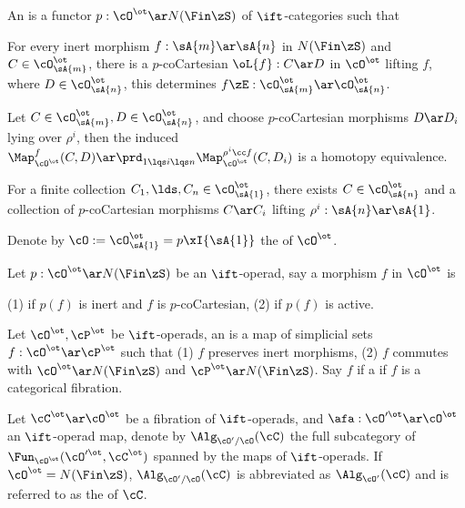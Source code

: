 \documentclass[article, a4paper, twoside]{universal}
\begin{document}
\begin{dfn}[2.1.1.10, 2.1.1.12]
    An  is a functor $p:\cO^{\ot}\ar N(\Fin\zS)$ of $\ift$-categories such that
    \begin{enr}[label=(\arabic*)]
        \item For every inert morphism $f:\sA{m}\ar\sA{n}$ in $N(\Fin\zS)$ and $C\in\cO^{\ot}_{\sA{m}}$, there is a $p$-coCartesian $\oL{f}:C\ar D$ in $\cO^{\ot}$ lifting $f$, where $D\in\cO^{\ot}_{\sA{n}}$, this determines $f\zE:\cO_{\sA{m}}^{\ot}\ar\cO_{\sA{n}}^{\ot}$.
        \item Let $C\in\cO_{\sA{m}}^{\ot},D\in\cO_{\sA{n}}^{\ot}$, and choose $p$-coCartesian morphisms $D\ar D_{i}$ lying over $\rho^{i}$, then the induced $\Map_{\cO^{\ot}}^{f}(C,D)\ar\prd_{1\lqs i\lqs n}\Map_{\cO^{\ot}}^{\rho^{i}\cc f}(C,D_{i})$ is a homotopy equivalence.
        \item For a finite collection $C_{1},\lds,C_{n}\in\cO_{\sA{1}}^{\ot}$, there exists $C\in\cO_{\sA{n}}^{\ot}$ and a collection of $p$-coCartesian morphisms $C\ar C_{i}$ lifting $\rho^{i}:\sA{n}\ar\sA{1}$.
    \end{enr}

    Denote by $\cO:=\cO^{\ot}_{\sA{1}}=p\xI\{\sA{1}\}$ the  of $\cO^{\ot}$.
\end{dfn}

\begin{dfn}[2.1.2.3]
    Let $p:\cO^{\ot}\ar N(\Fin\zS)$ be an $\ift$-operad, say a morphism $f$ in $\cO^{\ot}$ is

    (1)  if $p(f)$ is inert and $f$ is $p$-coCartesian, (2)  if $p(f)$ is active.
\end{dfn}

\begin{dfn}[2.1.2.7, 2.1.2.10]
    Let $\cO^{\ot},\cP^{\ot}$ be $\ift$-operads, an  is a map of simplicial sets $f:\cO^{\ot}\ar\cP^{\ot}$ such that (1) $f$ preserves inert morphisms, (2) $f$ commutes with $\cO^{\ot}\ar N(\Fin\zS)$ and $\cP^{\ot}\ar N(\Fin\zS)$. Say $f$ if a  if $f$ is a categorical fibration.
\end{dfn}

\begin{dfn}[2.1.3.1]
    Let $\cC^{\ot}\ar\cO^{\ot}$ be a fibration of $\ift$-operads, and $\afa:\cO'^{\ot}\ar\cO^{\ot}$ an $\ift$-operad map, denote by $\Alg_{\cO'/\cO}(\cC)$ the full subcategory of $\Fun_{\cO^{\ot}}(\cO'^{\ot},\cC^{\ot})$ spanned by the maps of $\ift$-operads. If $\cO^{\ot}=N(\Fin\zS)$, $\Alg_{\cO'/\cO}(\cC)$ is abbreviated as $\Alg_{\cO'}(\cC)$ and is referred to as the  of $\cC$.
\end{dfn}
\end{document}
